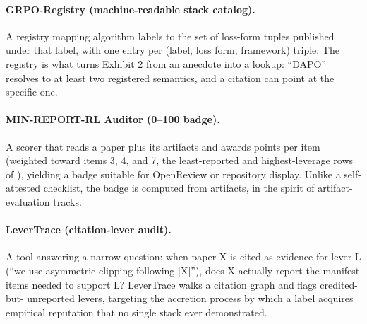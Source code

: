 \paragraph{GRPO-Registry (machine-readable stack catalog).} A registry
mapping algorithm labels to the set of loss-form tuples published under that
label, with one entry per (label, loss form, framework) triple. The registry
is what turns Exhibit 2 from an anecdote into a lookup: ``DAPO'' resolves to
at least two registered semantics, and a citation can point at the specific
one.

\paragraph{MIN-REPORT-RL Auditor (0--100 badge).} A scorer that reads a paper
plus its artifacts and awards points per item (weighted toward items 3, 4,
and 7, the least-reported and highest-leverage rows of
), yielding a badge suitable for OpenReview or
repository display. Unlike a self-attested checklist, the badge is computed
from artifacts, in the spirit of artifact-evaluation tracks.

\paragraph{LeverTrace (citation-lever audit).} A tool answering a narrow
question: when paper X is cited as evidence for lever L (``we use asymmetric
clipping following [X]''), does X actually report the manifest items needed
to support L? LeverTrace walks a citation graph and flags credited-but-
unreported levers, targeting the accretion process by which a label acquires
empirical reputation that no single stack ever demonstrated.

\endinput %
\subsection{Feasibility Evidence: The Telemetry Is Already Actionable}
\label{sec:p5-feasibility}
The manifest's most novel items (4 and 5) are not merely reportable---they
are cheap enough to compute that they can drive control decisions live, which
we take as strong evidence that emitting them adds negligible overhead. In
our single-file open-trainer audit (Stratum B; one auditable
reimplementation, held-out delta / mean ZVF / rollout count per arm:
grpo $+0.500$ / $0.25$ / $120$; drgrpo $+0.575$ / $0.27$ / $120$; dapo
$+0.550$ / $0.00$ / $174$, i.e.\ $+45\%$ rollouts for its ZVF-$0.00$
guarantee; adaptive-$G$ grpo $+0.575$ / $0.23$ / $186$), a
\texttt{zvf-triage} callback escalated the group size $4 \to 6 \to 8$ during
training in response to ZVF spikes. A quantity that can be acted on per-step
can certainly be logged per-step; conversely, the dapo arm's rollout premium
is exactly the kind of cost--benefit fact that only surfaces when items 4 and
5 are reported together.
